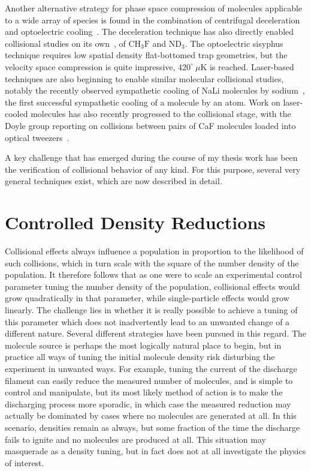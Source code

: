 Another alternative strategy for phase space compression of molecules applicable to a wide array of species is found in the combination of centrifugal deceleration and optoelectric cooling~\cite{Prehn2016}.
The deceleration technique has also directly enabled collisional studies on its own~\cite{Wu2017}, of $\text{CH}_3\text{F}$ and ND$_3$.
The optoelectric sisyphus technique requires low spatial density flat-bottomed trap geometries, but the velocity space compression is quite impressive, $420^\circ~\!\mu$K is reached.
Laser-based techniques are also beginning to enable similar molecular collisional studies, notably the recently observed sympathetic cooling of NaLi molecules by sodium~\cite{Park2019}, the first successful sympathetic cooling of a molecule by an atom.
Work on laser-cooled molecules has also recently progressed to the collisional stage, with the Doyle group reporting on collisions between pairs of CaF molecules loaded into optical tweezers~\cite{Anderegg2019}.

A key challenge that has emerged during the course of my thesis work has been the verification of collisional behavior of any kind.
For this purpose, several very general techniques exist, which are now described in detail.

\section{Controlled Density Reductions}

Collisional effects always influence a population in proportion to the likelihood of such collisions, which in turn scale with the square of the number density of the population.
It therefore follows that as one were to scale an experimental control parameter tuning the number density of the population, collisional effects would grow quadratically in that parameter, while single-particle effects would grow linearly.
The challenge lies in whether it is really possible to achieve a tuning of this parameter which does not inadvertently lead to an unwanted change of a different nature.
Several different strategies have been pursued in this regard.
The molecule source is perhaps the most logically natural place to begin, but in practice all ways of tuning the initial molecule density risk disturbing the experiment in unwanted ways.
For example, tuning the current of the discharge filament can easily reduce the measured number of molecules, and is simple to control and manipulate, but its most likely method of action is to make the discharging process more sporadic, in which case the measured reduction may actually be dominated by cases where no molecules are generated at all.
In this scenario, densities remain as always, but some fraction of the time the discharge fails to ignite and no molecules are produced at all.
This situation may masquerade as a density tuning, but in fact does not at all investigate the physics of interest.

